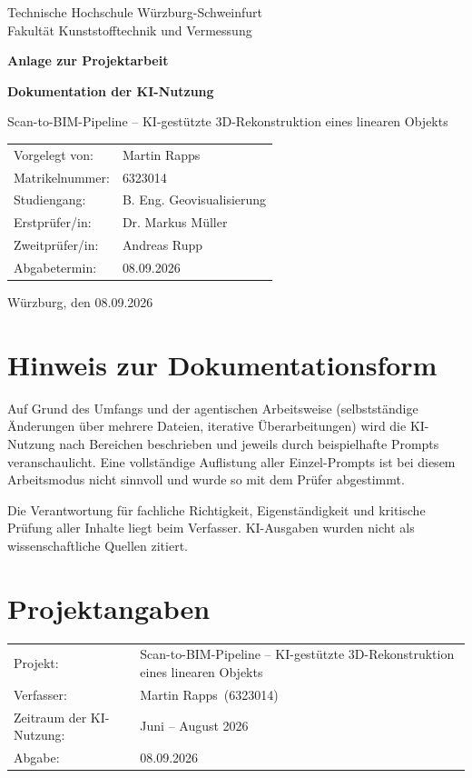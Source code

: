 \documentclass[12pt,a4paper]{article}
\newcommand{\thwsAuthor}{Martin Rapps}
\newcommand{\thwsMatriculation}{6323014}
\newcommand{\thwsDegree}{B. Eng. Geovisualisierung}
\newcommand{\thwsFirstExaminer}{Dr. Markus Müller}
\newcommand{\thwsSecondExaminer}{Andreas Rupp}
\newcommand{\thwsSubmissionDate}{08.09.2026}
\begin{document}
\thispagestyle{empty}
\begin{center}
	{\large Technische Hochschule Würzburg-Schweinfurt\\
	Fakultät Kunststofftechnik und Vermessung\par}
	\vfill
	{\LARGE\bfseries Anlage zur Projektarbeit\par}
	\vspace{1.0cm}
	{\Large\bfseries Dokumentation der KI-Nutzung\par}
	\vspace{0.6cm}
	{\large Scan-to-BIM-Pipeline -- KI-gestützte 3D-Rekonstruktion eines linearen Objekts\par}
	\vfill
	\begin{tabular}{@{}ll@{}}
		Vorgelegt von: & \thwsAuthor\\
		Matrikelnummer: & \thwsMatriculation\\
		Studiengang: & \thwsDegree\\
		Erstprüfer/in: & \thwsFirstExaminer\\
		Zweitprüfer/in: & \thwsSecondExaminer\\
		Abgabetermin: & \thwsSubmissionDate
	\end{tabular}
	\vfill
	Würzburg, den \thwsSubmissionDate
\end{center}
\clearpage

\section*{Hinweis zur Dokumentationsform}
Auf Grund des Umfangs und der agentischen Arbeitsweise (selbstständige Änderungen über mehrere Dateien, iterative Überarbeitungen) wird die KI-Nutzung nach Bereichen beschrieben und jeweils durch beispielhafte Prompts veranschaulicht. Eine vollständige Auflistung aller Einzel-Prompts ist bei diesem Arbeitsmodus nicht sinnvoll und wurde so mit dem Prüfer abgestimmt.

Die Verantwortung für fachliche Richtigkeit, Eigenständigkeit und kritische Prüfung aller Inhalte liegt beim Verfasser. KI-Ausgaben wurden nicht als wissenschaftliche Quellen zitiert.

\tableofcontents
\clearpage
{}

\section{Projektangaben}

\begin{tabular}{@{}ll@{}}
Projekt: & Scan-to-BIM-Pipeline -- KI-gestützte 3D-Rekonstruktion eines linearen Objekts \\
Verfasser: & \thwsAuthor\ (\thwsMatriculation) \\
Zeitraum der KI-Nutzung: & Juni -- August 2026 \\
Abgabe: & \thwsSubmissionDate \\
\end{tabular}
\end{document}
